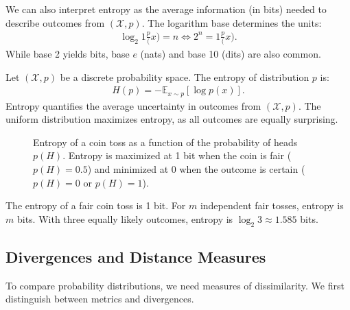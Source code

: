 We can also interpret entropy as the average information (in bits) needed to describe outcomes from $(\mathcal{X}, p)$. The logarithm base determines the units:
\begin{align}
	\label{eq:understand-log}
	\log_2{1 \frac p(x)} = n \iff 2^n = {1 \frac p(x)}.
\end{align}
While base 2 yields bits, base $e$ (nats) and base 10 (dits) are also common.

\begin{definition}
	Let $(\mathcal{X}, p)$ be a discrete probability space. The \textnormal{\sffamily entropy} of distribution $p$ is:
	\begin{align}
		\label{eq:entropy}
		H(p) = - \mathbb{E}_{x \sim p} \left[ \log{p(x)} \right].
	\end{align}
	Entropy quantifies the average uncertainty in outcomes from $(\mathcal{X}, p)$. The uniform distribution maximizes entropy, as all outcomes are equally surprising.
\end{definition}

\begin{figure}[H]
	\centering
	\caption{Entropy of a coin toss as a function of the probability of heads $p(H)$. Entropy is maximized at 1 bit when the coin is fair ($p(H)=0.5$) and minimized at 0 when the outcome is certain ($p(H)=0$ or $p(H)=1$).}%
	\label{fig:entropy-coin-toss}
\end{figure}

\begin{example}
	The entropy of a fair coin toss is 1 bit. For $m$ independent fair tosses, entropy is $m$ bits. With three equally likely outcomes, entropy is $\log_2{3} \approx 1.585$ bits.
\end{example}

\subsection{Divergences and Distance Measures}
To compare probability distributions, we need measures of dissimilarity. We first distinguish between metrics and divergences.

